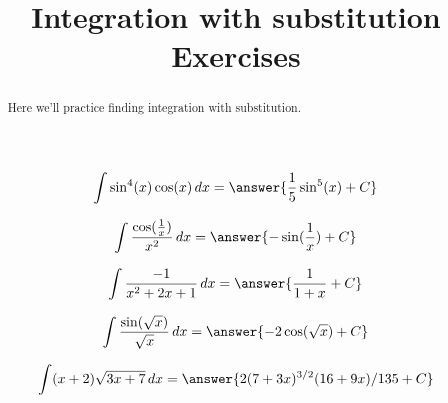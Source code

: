 \documentclass[handout]{ximera}
\title[Exercises:]{Integration with substitution Exercises}
\begin{document}
\begin{abstract}
  Here we'll practice finding integration with substitution.
\end{abstract}
\maketitle

\begin{exercise}
\[
\int \sin^4(x)\cos(x) \d x = \answer{\frac{1}{5} \sin^5(x)+C} 
\]

\end{exercise}

\begin{exercise}
\[
\int \frac{\cos(\frac{1}{x})}{x^2} \d x = \answer{-\sin(\frac{1}{x})+C}
\]

\end{exercise}

\begin{exercise}
\[
\int \frac{-1}{x^2+2x+1} \d x = \answer{\frac{1}{1+x}+C}
\]

\end{exercise}


\begin{exercise}
\[
\int \frac{\sin(\sqrt{x})}{\sqrt{x}} \d x = \answer{-2\cos(\sqrt{x})+C} 
\]

\end{exercise}

\begin{exercise}
\[
\int (x+2)\sqrt{3x+7} \d x = \answer{2 (7 + 3 x)^{3/2} (16 + 9 x)/135+C} 
\]

\end{exercise}
\end{document}
